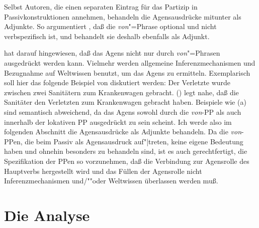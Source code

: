 Selbst Autoren, die einen separaten Eintrag für das Partizip in Passivkonstruktionen annehmen, behandeln
die Agensausdrücke mitunter als Adjunkte. So argumentiert \zb \citet[]{Zifonun92a}, daß die \emph{von}"=Phrase 
optional und nicht verbspezifisch ist, und behandelt sie deshalb ebenfalls als Adjunkt.


\citet[Kapitel~7]{Hoehle78a} hat darauf hingewiesen, daß das Agens nicht nur durch
\emph{von}"=Phrasen ausgedrückt werden kann. Vielmehr werden allgemeine Inferenzmechanismen und Bezugnahme auf
Weltwissen benutzt, um das Agens zu ermitteln. Exemplarisch soll hier das folgende Beispiel von \citet[]{Hoehle78a}
diskutiert werden:
\ea
Der Verletzte wurde zwischen zwei Sanitätern zum Krankenwagen gebracht.
\z
() legt nahe, daß die Sanitäter den Verletzten zum Krankenwagen gebracht haben.
Beispiele wie (a) sind semantisch abweichend, da das Agens sowohl
durch die \emph{von}-PP als auch innerhalb der lokativen PP ausgedrückt zu sein scheint.
\eal
\label{ex-sanitaeter}
\zl
Ich werde also im folgenden Abschnitt die Agensausdrücke als Adjunkte behandeln. Da
die \emph{von}-PPen, die beim Passiv als Agensausdruck auf"|treten, keine eigene Bedeutung
haben und ohnehin besonders zu behandeln sind, ist es auch gerechtfertigt, die Spezifikation
der PPen so vorzunehmen, daß die Verbindung zur Agensrolle des Hauptverbs hergestellt wird
und das Füllen der Agensrolle nicht Inferenzmechanismen und/""oder Weltwissen
überlassen werden muß.
 


\section{Die Analyse}
\label{sec-passive-anal}

